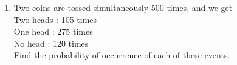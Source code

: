 \renewcommand{\theequation}{\theenumi}
\begin{enumerate}[label=\arabic*.,ref=\thesubsection.\theenumi]
\item Two coins are tossed simultaneously 500 times, and we get\\
Two heads : 105 times\\
One head : 275 times\\
No head : 120 times\\
Find the probability of occurrence of each of these events.
\end{enumerate}
